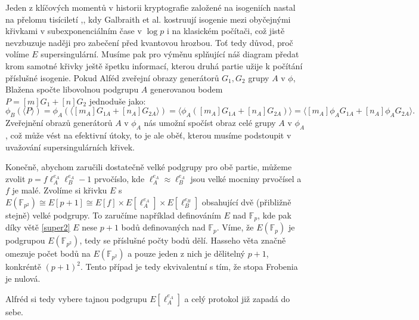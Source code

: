 \documentclass[12pt]{report}
\begin{document}
Jeden z klíčových momentů v historii kryptografie založené na isogeniích nastal na přelomu tisíciletí \cite{Galbraith},\cite{Galbraith2}, kdy Galbraith et al. kostruují isogenie mezi obyčejnými křivkami v subexponenciálním čase v $\log p$ i na klasickém počítači, což jistě nevzbuzuje naději pro zabečení před kvantovou hrozbou. Toť tedy důvod, proč volíme $E$ supersingulární. Musíme pak pro výměnu splňující náš diagram předat krom samotné křivky ještě špetku informací, kterou druhá partie užije k počítání příslušné isogenie. Pokud Alféd zveřejní obrazy generátorů $G_{1},G_{2}$ grupy $A$ v $\phi$, Blažena spočte libovolnou podgrupu $A$ generovanou bodem $P = [m]G_{1} + [n]G_2$ jednoduše jako:
\begin{equation*}\label{clubsuit}
\phi_B (\langle P \rangle) = \phi_A (\langle [m_A] G_{1A} + [n_A] G_{2A} \rangle) = \langle \phi_A ([m_A] G_{1A} + [n_A] G_{2A}) \rangle = \langle [m_A] \phi_A G_{1A} + [n_A] \phi_A G_{2A} \rangle. \tag{$\clubsuit$}
\end{equation*}
Zveřejnění obrazů generátorů $A$ v $\phi_A$ nás umožní spočíst obraz celé grupy $A$ v $\phi_A$, což může vést na efektivní útoky, to je ale oběť, kterou musíme podstoupit v uvažování supersingulárních křivek.

Konečně, abychom zaručili dostatečně velké podgrupy pro obě partie, můžeme zvolit $p = f \ell_A ^{e_A} \ell_B ^ {e_A} - 1$ prvočíslo, kde $\ell_A ^ {e_A} \approx \ell_B ^{e_A}$ jsou velké mocniny prvočísel a $f$ je malé. Zvolíme si křivku $E$ s $E(\mathbb{F}_{p^2}) \cong E[p+1] \cong E[f] \times E[\ell_A ^{e_A}] \times E[\ell_B ^{e_B}]$ obsahující dvě (přibližně stejně) velké podgrupy. To zaručíme například definováním $E$ nad $\mathbb{F}_p$, kde pak díky větě \ref{super2} $E$ nese $p+1$ bodů definovaných nad $\mathbb{F}_p$. Víme, že $E(\mathbb{F}_p)$ je podgrupou $E(\mathbb{F}_{p^2})$, tedy se příslušné počty bodů dělí. Hasseho věta značně omezuje počet bodů na $E(\mathbb{F}_{p^2})$ a pouze jeden z nich je dělitelný $p+1$, konkréntě $(p+1)^2$. Tento případ je tedy ekvivalentní s tím, že stopa Frobenia je nulová.

Alfréd si tedy vybere tajnou podgrupu $E[\ell_A ^{e_A}]$ a celý protokol již zapadá do sebe.
\end{document}
